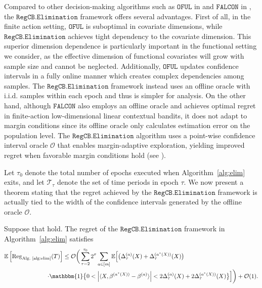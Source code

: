 \documentclass[mnsc]{informs3aa} %
\newcommand{\Reg}{\mathrm{Reg}}
\newcommand{\abs}[1]{\left|#1\right|}
\newcommand{\mT}{\mathcal T}
\newcommand{\mF}{\mathcal F}
\newcommand{\indi}{\mathbbm{1}}
\newcommand{\mO}{\mathcal O}
\begin{document}
Compared to other decision-making algorithms such as \(\mathtt{OFUL}\) in \cite{abbasi2011improved} and \(\mathtt{FALCON}\) in \cite{simchi2022bypassing}, the \(\mathtt{RegCB.Elimination}\) framework offers several advantages. First of all, in the finite action setting, \(\mathtt{OFUL}\) is suboptimal in covariate dimensions, while \(\mathtt{RegCB.Elimination}\) achieves tight dependency to the covariate dimension. This superior dimension dependence is particularly important in the functional setting we consider, as the effective dimension of functional covariates will grow with sample size and cannot be neglected. Additionally, \(\mathtt{OFUL}\) updates confidence intervals in a fully online manner which creates complex dependencies among samples. The \(\mathtt{RegCB.Elimination}\) framework  instead uses an offline oracle with i.i.d. samples within each epoch and thus is simpler for analysis. On the other hand, although \(\mathtt{FALCON}\) also employs an offline oracle and achieves optimal regret in finite-action low-dimensional linear contextual bandits, it does not adapt to margin conditions since its offline oracle only calculates estimation error on the population level. The \(\mathtt{RegCB.Elimination}\) algorithm uses a point-wise confidence interval oracle \(\mathcal{O}\) that enables margin-adaptive exploration, yielding improved regret when favorable margin conditions hold (see ).

Let $\tau_0$ denote the total number of epochs executed when Algorithm~\ref{alg:elim} exits, and let $\mT_\tau$ denote the set of time periods in epoch $\tau.$
We now present a theorem stating that the regret achieved by the \(\mathtt{RegCB.Elimination}\) framework is actually tied to the width of the confidence intervals generated by the offline oracle $\mO.$
\begin{theorem}\label{thm:elimregret}
	Suppose that  hold. The regret of the \(\mathtt{RegCB.Elimination}\) framework in Algorithm~\ref{alg:elim} satisfies
	\[\begin{aligned}
	\mathbb{E}\left[\Reg_{\text{Alg.~\ref{alg:elim}}}(T)\right]\leq\mO\bigg(\sum_{\tau=2}^{\tau_0}2^\tau\sum_{a\in[m]}\mathbb{E}\Big[\big(\Delta_{\tau}^{(a)}(X)+\Delta_{\tau}^{(a^*(X))}(X)\big)&\\
	\cdot\indi\big\{0<\abs{\langle X,\beta^{(a^*(X))}-\beta^{(a)}\rangle}< 2\Delta_\tau^{(a)}(X)&+2\Delta_\tau^{(a^*(X))}(X)\big\}\Big]\bigg)+\mO(1).
	\end{aligned}\]
\end{theorem}
\end{document}
